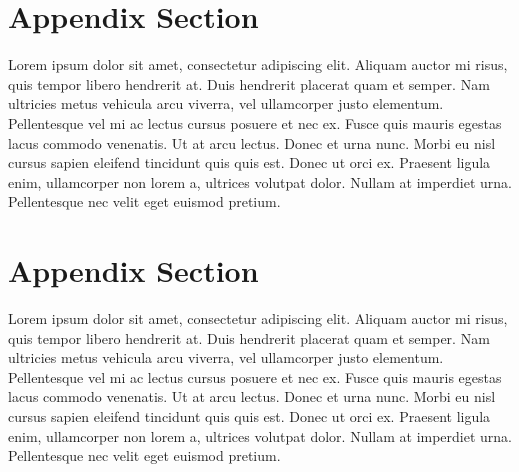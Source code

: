 \documentclass[
	a4paper, %
	10pt, %
]{CSSullivanBusinessReport}
\begin{document}
\begin{fullwidth}
\begin{justify}
\begin{appendices}
\section{Appendix Section}

Lorem ipsum dolor sit amet, consectetur adipiscing elit. Aliquam auctor mi risus, quis tempor libero hendrerit at. Duis hendrerit placerat quam et semper. Nam ultricies metus vehicula arcu viverra, vel ullamcorper justo elementum. Pellentesque vel mi ac lectus cursus posuere et nec ex. Fusce quis mauris egestas lacus commodo venenatis. Ut at arcu lectus. Donec et urna nunc. Morbi eu nisl cursus sapien eleifend tincidunt quis quis est. Donec ut orci ex. Praesent ligula enim, ullamcorper non lorem a, ultrices volutpat dolor. Nullam at imperdiet urna. Pellentesque nec velit eget euismod pretium.

\section{Appendix Section}

Lorem ipsum dolor sit amet, consectetur adipiscing elit. Aliquam auctor mi risus, quis tempor libero hendrerit at. Duis hendrerit placerat quam et semper. Nam ultricies metus vehicula arcu viverra, vel ullamcorper justo elementum. Pellentesque vel mi ac lectus cursus posuere et nec ex. Fusce quis mauris egestas lacus commodo venenatis. Ut at arcu lectus. Donec et urna nunc. Morbi eu nisl cursus sapien eleifend tincidunt quis quis est. Donec ut orci ex. Praesent ligula enim, ullamcorper non lorem a, ultrices volutpat dolor. Nullam at imperdiet urna. Pellentesque nec velit eget euismod pretium.

\end{appendices}

\end{justify}
\end{fullwidth}
\end{document}
